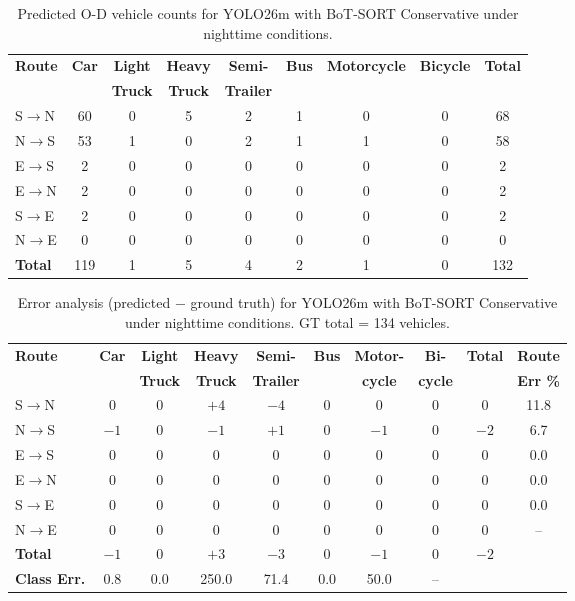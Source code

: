 \begin{table}[H]
\caption{Predicted O-D vehicle counts for YOLO26m with BoT-SORT Conservative under
nighttime conditions.}
\centering
\small
\begin{tabular}{l c c c c c c c c}
\toprule
\textbf{Route} & \textbf{Car} & \textbf{Light} & \textbf{Heavy} & \textbf{Semi-} & \textbf{Bus} & \textbf{Motorcycle} & \textbf{Bicycle} & \textbf{Total} \\
 & & \textbf{Truck} & \textbf{Truck} & \textbf{Trailer} &  & & &  \\
\midrule
S$\to$N & 60 & 0 & 5 & 2 & 1 & 0 & 0 & 68 \\
N$\to$S & 53 & 1 & 0 & 2 & 1 & 1 & 0 & 58 \\
E$\to$S & 2  & 0 & 0 & 0 & 0 & 0 & 0 & 2  \\
E$\to$N & 2  & 0 & 0 & 0 & 0 & 0 & 0 & 2  \\
S$\to$E & 2  & 0 & 0 & 0 & 0 & 0 & 0 & 2  \\
N$\to$E & 0  & 0 & 0 & 0 & 0 & 0 & 0 & 0  \\
\bottomrule
\textbf{Total} & 119 & 1 & 5 & 4 & 2 & 1 & 0 & 132 \\
\bottomrule
\end{tabular}
\label{tab:od_nighttime_best}
\end{table}

\begin{table}[H]
\caption{Error analysis (predicted $-$ ground truth) for YOLO26m with BoT-SORT
Conservative under nighttime conditions. GT total = 134 vehicles.}
\centering
\small
\begin{tabular}{l c c c c c c c c c}
\toprule
\textbf{Route} & \textbf{Car} & \textbf{Light} & \textbf{Heavy} & \textbf{Semi-} & \textbf{Bus} & \textbf{Motor-} & \textbf{Bi-} & \textbf{Total} & \textbf{Route} \\
 & & \textbf{Truck} & \textbf{Truck} & \textbf{Trailer} & & \textbf{cycle} & \textbf{cycle} & & \textbf{Err \%} \\
\midrule
S$\to$N & 0 & 0 & $+4$ & $-4$ & 0 & 0 & 0 & 0 & 11.8 \\
N$\to$S & $-1$ & 0 & $-1$ & $+1$ & 0 & $-1$ & 0 & $-2$ & 6.7 \\
E$\to$S & 0 & 0 & 0 & 0 & 0 & 0 & 0 & 0 & 0.0 \\
E$\to$N & 0 & 0 & 0 & 0 & 0 & 0 & 0 & 0 & 0.0 \\
S$\to$E & 0 & 0 & 0 & 0 & 0 & 0 & 0 & 0 & 0.0 \\
N$\to$E & 0 & 0 & 0 & 0 & 0 & 0 & 0 & 0 & -- \\
\midrule
\textbf{Total} & $-1$ & 0 & $+3$ & $-3$ & 0 & $-1$ & 0 & $-2$ & \\
\midrule[1.5pt]
\textbf{Class Err.} & 0.8 & 0.0 & 250.0 & 71.4 & 0.0 & 50.0 & -- & & \\
\bottomrule
\end{tabular}
\label{tab:od_nighttime_error}
\end{table}

